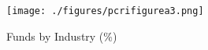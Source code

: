 
\begin{figure}[tb]
    \centering
\texttt{[image: ./figures/pcrifigurea3.png]}
\caption{Funds by Industry (\%)\label{fig:pcrifigurea3}}
\end{figure}
